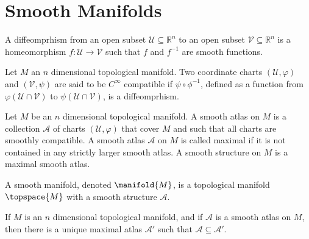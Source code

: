 \documentclass{article}                                                        %
\begin{document}
    \section{Smooth Manifolds}
        \begin{definition}
            A diffeomprhism from an open subset
            $\mathcal{U}\subseteq\mathbb{R}^{n}$ to an open subset
            $\mathcal{V}\subseteq\mathbb{R}^{n}$ is a homeomorphism
            $f:\mathcal{U}\rightarrow\mathcal{V}$ such that $f$ and
            $f^{\minus{1}}$ are smooth functions.
        \end{definition}
        \begin{definition}
            Let $M$ an $n$ dimensional topological manifold. Two coordinate
            charts $(\mathcal{U},\varphi)$ and $(\mathcal{V},\psi)$ are said to
            be $C^{\infty}$ compatible if $\psi\circ\phi^{\minus{1}}$,
            defined as a function from $\varphi(\mathcal{U}\cap\mathcal{V})$ to
            $\psi(\mathcal{U}\cap\mathcal{V})$, is a diffeomprhism.
        \end{definition}
        \begin{definition}
            Let $M$ be an $n$ dimensional topological manifold. A smooth atlas
            on $M$ is a collection $\mathcal{A}$ of charts
            $(\mathcal{U},\varphi)$ that cover $M$ and such that all charts
            are smoothly compatible. A smooth atlas $\mathcal{A}$ on $M$ is
            called maximal if it is not contained in any strictly larger
            smooth atlas. A smooth structure on $M$ is a maximal smooth atlas.
        \end{definition}
        \begin{definition}
            A smooth manifold, denoted $\manifold{M}$, is a topological manifold
            $\topspace{M}$ with a smooth structure $\mathcal{A}$.
        \end{definition}
        \begin{theorem}
            If $M$ is an $n$ dimensional topological manifold, and if
            $\mathcal{A}$ is a smooth atlas on $M$, then there is a unique
            maximal atlas $\mathcal{A}'$ such that
            $\mathcal{A}\subseteq\mathcal{A}'$.
        \end{theorem}
\end{document}
